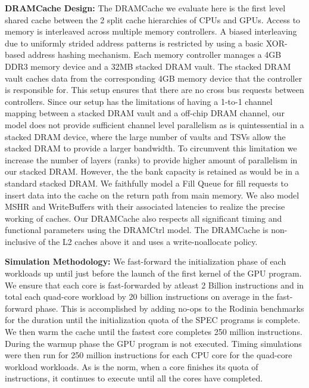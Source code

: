 \par \textbf{DRAMCache Design:} The DRAMCache we evaluate here is the first level shared cache between the 2 split cache hierarchies of CPUs and GPUs. Access to memory is interleaved across multiple memory controllers. A biased interleaving due to uniformly strided address patterns is restricted by using a basic XOR-based address hashing mechanism. Each memory controller manages a 4GB DDR3 memory device and a 32MB stacked DRAM vault. The stacked DRAM vault caches data from the corresponding 4GB memory device that the controller is responsible for. This setup ensures that there are no cross bus requests between controllers. Since our setup has the limitations of having a 1-to-1 channel mapping between a stacked DRAM vault and a off-chip DRAM channel, our model does not provide sufficient channel level parallelism as is quintessential in a stacked DRAM device, where the large number of vaults and TSVs allow the stacked DRAM to provide a larger bandwidth. To circumvent this limitation we increase the number of layers (ranks) to provide higher amount of parallelism in our stacked DRAM. However, the the bank capacity is retained as would be in a standard stacked DRAM. We faithfully model a Fill Queue \cite{dca} for fill requests to insert data into the cache on the return path from main memory. We also model MSHR and WriteBuffers with their associated latencies to realize the precise working of caches. Our DRAMCache also respects all significant timing and functional parameters using the DRAMCtrl \cite{dramctrl} model. The DRAMCache is non-inclusive \cite{coherence-dramcache} of the  L2 caches above it and uses a write-noallocate policy.\\
\par \textbf{Simulation Methodology:} We fast-forward the initialization phase of each workloads up until just before the launch of the first kernel of the GPU program. We ensure that each core is fast-forwarded by atleast 2 Billion instructions and in total each quad-core workload by 20 billion instructions on average in the fast-forward phase. This is accomplished by adding no-ops to the Rodinia benchmarks for the duration until the initialization quota of the SPEC programs is complete. We then warm the cache until the fastest core completes 250 million instructions. During the warmup phase the GPU program is not executed. Timing simulations were then run for 250 million instructions for each CPU core for the quad-core workload workloads. As is the norm, when a core finishes its quota of instructions, it continues to execute until all the cores have completed. \\
